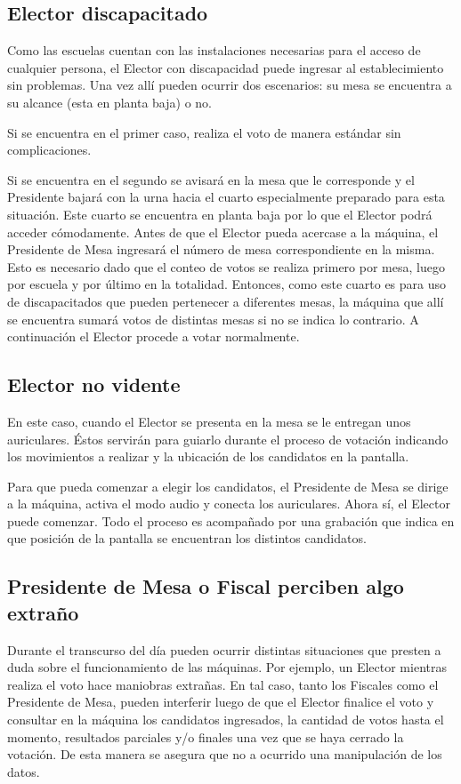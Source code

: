 \documentclass[spanish, 10pt,a4paper]{article}
\numberwithin{equation}{section} %
\begin{document}
\subsection{Elector discapacitado}
	Como las escuelas cuentan con las instalaciones necesarias para el acceso de cualquier persona, el Elector con discapacidad puede ingresar al establecimiento sin problemas. Una vez allí pueden ocurrir dos escenarios: su mesa se encuentra a su alcance (esta en planta baja) o no.
	
	Si se encuentra en el primer caso, realiza el voto de manera estándar sin complicaciones. 
	
	Si se encuentra en el segundo se avisará en la mesa que le corresponde y el Presidente bajará con la urna hacia el cuarto especialmente preparado para esta situación.	Este cuarto se encuentra en planta baja por lo que el Elector podrá acceder cómodamente. Antes de que el Elector pueda acercase a la máquina, el Presidente de Mesa ingresará el número de mesa correspondiente en la misma. Esto es necesario dado que el conteo de votos se realiza primero por mesa, luego por escuela y por último en la totalidad. Entonces, como este cuarto es para uso de discapacitados que pueden pertenecer a diferentes mesas, la máquina que allí se encuentra sumará votos de distintas mesas si no se indica lo contrario. A continuación el Elector procede a votar normalmente.

\subsection{Elector no vidente}

	En este caso, cuando el Elector se presenta en la mesa se le entregan unos auriculares. Éstos servirán para guiarlo durante el proceso de votación indicando los movimientos a realizar y la ubicación de los candidatos en la pantalla.
	
	Para que pueda comenzar a elegir los candidatos, el Presidente de Mesa se dirige a la máquina, activa el modo audio y conecta los auriculares. Ahora sí, el Elector puede comenzar. Todo el proceso es acompañado por una grabación que indica en que posición de la pantalla se encuentran los distintos candidatos.
	
\subsection{Presidente de Mesa o Fiscal perciben algo extraño}
	Durante el transcurso del día pueden ocurrir distintas situaciones que presten a duda sobre el funcionamiento de las máquinas. Por ejemplo, un Elector mientras realiza el voto hace maniobras extrañas. En tal caso, tanto los Fiscales como el Presidente de Mesa, pueden interferir luego de que el Elector finalice el voto y consultar en la máquina los candidatos ingresados, la cantidad de votos hasta el momento, resultados parciales y/o finales una vez que se haya cerrado la votación. De esta manera se asegura que no a ocurrido una manipulación de los datos. 
	
\end{document}
